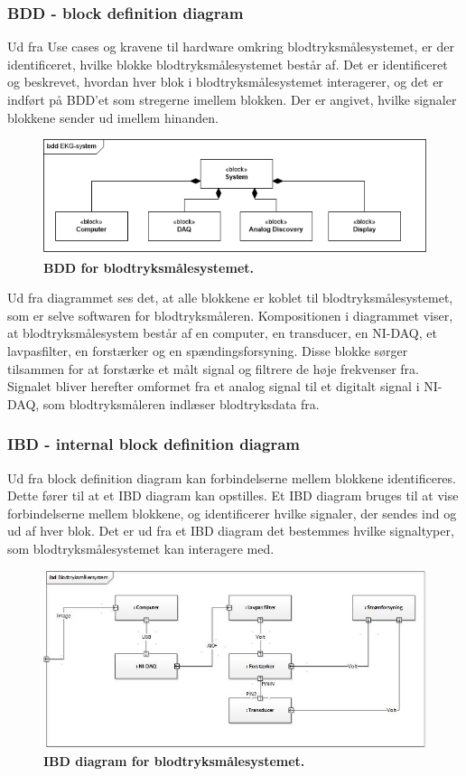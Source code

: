 \subsubsection{BDD - block definition diagram}
Ud fra Use cases og kravene til hardware omkring blodtryksmålesystemet, er der identificeret, hvilke blokke blodtryksmålesystemet består af. Det er identificeret og beskrevet, hvordan hver blok i blodtryksmålesystemet interagerer, og det er indført på BDD’et som stregerne imellem blokken. Der er angivet, hvilke signaler blokkene sender ud imellem hinanden.  
\begin{figure}[H]
\includegraphics[width =1.0\textwidth , center]{billeder/BDD}
\caption{\textbf{BDD for blodtryksmålesystemet.}}
\end{figure}
Ud fra diagrammet ses det, at alle blokkene er koblet til blodtryksmålesystemet, som er selve softwaren for blodtryksmåleren. Kompositionen i diagrammet viser, at blodtryksmålesystem består af en computer, en transducer, en NI-DAQ, et lavpasfilter, en forstærker og en spændingsforsyning. Disse blokke sørger tilsammen for at forstærke et målt signal og filtrere de høje frekvenser fra. Signalet bliver herefter omformet fra et analog signal til et digitalt signal i NI-DAQ, som blodtryksmåleren indlæser blodtryksdata fra. 
\subsubsection{IBD - internal block definition diagram}
Ud fra block definition diagram kan forbindelserne mellem blokkene identificeres. Dette fører til at et IBD diagram kan opstilles. Et IBD diagram bruges til at vise forbindelserne mellem blokkene, og identificerer hvilke signaler, der sendes ind og ud af hver blok. Det er ud fra et IBD diagram det bestemmes hvilke signaltyper, som blodtryksmålesystemet kan interagere med.
\begin{figure}[H]
\includegraphics[width =1.0\textwidth , center]{billeder/IBD}
\caption{\textbf{IBD diagram for blodtryksmålesystemet.}}
\end{figure}
